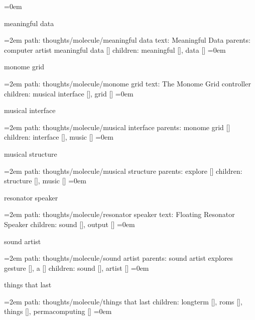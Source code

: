 \smallskip
\leftskip=0em
\par\endgroup
\bigskip
{}
meaningful data
\smallskip
\par\begingroup
\leftskip=2em
path: thoughts/molecule/meaningful data
\smallskip
text:  Meaningful Data
\smallskip
parents:  computer artist meaningful data []
\smallskip
children: meaningful [], data []
\smallskip
\leftskip=0em
\par\endgroup
\bigskip
{}
monome grid
\smallskip
\par\begingroup
\leftskip=2em
path: thoughts/molecule/monome grid
\smallskip
text:  The Monome Grid controller
\smallskip
children: musical interface [], grid []
\smallskip
\leftskip=0em
\par\endgroup
\bigskip
{}
musical interface
\smallskip
\par\begingroup
\leftskip=2em
path: thoughts/molecule/musical interface
\smallskip
parents:  monome grid []
\smallskip
children: interface [], music []
\smallskip
\leftskip=0em
\par\endgroup
\bigskip
{}
musical structure
\smallskip
\par\begingroup
\leftskip=2em
path: thoughts/molecule/musical structure
\smallskip
parents:  explore []
\smallskip
children: structure [], music []
\smallskip
\leftskip=0em
\par\endgroup
\bigskip
{}
resonator speaker
\smallskip
\par\begingroup
\leftskip=2em
path: thoughts/molecule/resonator speaker
\smallskip
text:  Floating Resonator Speaker
\smallskip
children: sound [], output []
\smallskip
\leftskip=0em
\par\endgroup
\bigskip
{}
sound artist
\smallskip
\par\begingroup
\leftskip=2em
path: thoughts/molecule/sound artist
\smallskip
parents:  sound artist explores gesture [], a []
\smallskip
children: sound [], artist []
\smallskip
\leftskip=0em
\par\endgroup
\bigskip
{}
things that last
\smallskip
\par\begingroup
\leftskip=2em
path: thoughts/molecule/things that last
\smallskip
children: longterm [], roms [], things [], permacomputing []
\smallskip
\leftskip=0em
\par\endgroup
